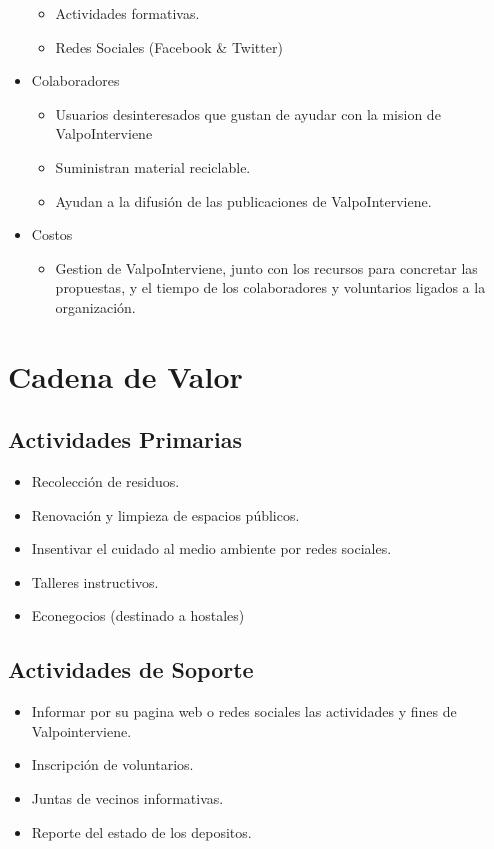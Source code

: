 \documentclass[paper=letter, fontsize=11pt]{scrartcl} %
\numberwithin{equation}{section} %
\numberwithin{figure}{section} %
\numberwithin{table}{section} %
\begin{document}
\begin{itemize}
\begin{itemize}
\item Actividades formativas.
\item Redes Sociales (Facebook \& Twitter)
\end{itemize}
\item Colaboradores
\begin{itemize}
\item Usuarios desinteresados que gustan de ayudar con la mision de ValpoInterviene
\item Suministran material reciclable.
\item Ayudan a la difusión de las publicaciones de ValpoInterviene.
\end{itemize}
\item Costos
\begin{itemize}
\item Gestion de  ValpoInterviene, junto con los recursos para concretar las propuestas, y el tiempo de los colaboradores y voluntarios ligados a la organización.
\end{itemize}
\end{itemize} 
\section*{Cadena de Valor}
\subsection*{Actividades Primarias}
\begin{itemize}
\item Recolección de residuos.
\item Renovación y limpieza de espacios públicos.
\item Insentivar el cuidado al medio ambiente por redes sociales.
\item Talleres instructivos.
\item Econegocios (destinado a hostales)
\end{itemize}
\subsection*{Actividades de Soporte}
\begin{itemize}
\item Informar por su pagina web o redes sociales las actividades y fines de Valpointerviene.
\item Inscripción de voluntarios.
\item Juntas de vecinos informativas.
\item Reporte del estado de los depositos.
\end{itemize}
\end{document}

